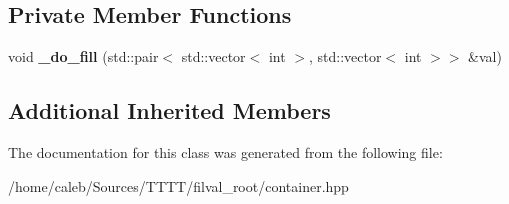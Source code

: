 \subsection*{Private Member Functions}
\begin{DoxyCompactItemize}
\item 
\hypertarget{classfv_1_1root_1_1ContainerTH2IMany_accb852d9d896903c367fb949cf7f828c}{}\label{classfv_1_1root_1_1ContainerTH2IMany_accb852d9d896903c367fb949cf7f828c} 
void {\bfseries \+\_\+do\+\_\+fill} (std\+::pair$<$ std\+::vector$<$ int $>$, std\+::vector$<$ int $>$$>$ \&val)
\end{DoxyCompactItemize}
\subsection*{Additional Inherited Members}


The documentation for this class was generated from the following file\+:\begin{DoxyCompactItemize}
\item 
/home/caleb/\+Sources/\+T\+T\+T\+T/filval\+\_\+root/container.\+hpp\end{DoxyCompactItemize}
